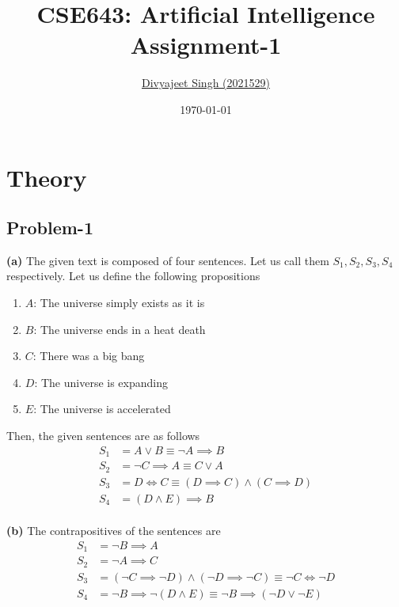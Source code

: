 \documentclass[12pt]{article}
\title{
    \textbf{CSE643: Artificial Intelligence} \\ \vspace*{-5pt}
    \textbf{\large{Assignment-1}}
}
\author{\href{mailto:divyajeet21529@iiitd.ac.in}{Divyajeet Singh (2021529)}}
\date{\today}
\begin{document}
    \maketitle

    \section*{Theory}

    \subsection*{Problem-1}
    \textbf{(a)}
    The given text is composed of four sentences. Let us call them $S_{1}, S_{2}, S_{3}, S_{4}$ respectively.
    Let us define the following propositions
    \begin{enumerate}
        \item $A$: The universe simply exists as it is
        \item $B$: The universe ends in a heat death
        \item $C$: There was a big bang
        \item $D$: The universe is expanding
        \item $E$: The universe is accelerated
    \end{enumerate}
    Then, the given sentences are as follows
    \begin{align}
        \label{eq:s1}
        S_{1} &= A \vee B \equiv \lnot A \implies B \\
        \label{eq:s2}
        S_{2} &= \lnot C \implies A \equiv C \vee A \\
        \label{eq:s3}
        S_{3} &= D \Longleftrightarrow C \equiv (D \implies C) \wedge (C \implies D) \\
        \label{eq:s4}
        S_{4} &= (D \wedge E) \implies B
    \end{align}
    \vspace*{0pt} \\
    \textbf{(b)}
    The contrapositives of the sentences are
    \begin{align*}
        S_{1} &= \lnot B \implies A \\
        S_{2} &= \lnot A \implies C \\
        S_{3} &= (\lnot C \implies \lnot D) \wedge (\lnot D \implies \lnot C) \equiv \lnot C \Longleftrightarrow \lnot D \\
        S_{4} &= \lnot B \implies \lnot (D \wedge E) \equiv \lnot B \implies (\lnot D \vee \lnot E)
    \end{align*}
\end{document}
